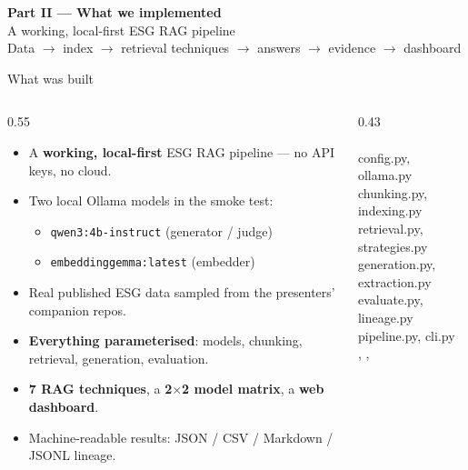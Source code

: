 \documentclass[aspectratio=169]{beamer}
\begin{document}
\begin{frame}
  \begin{center}
    \vspace{1.2cm}
    {\Large\bfseries Part II --- What we implemented}\\[4mm]
    {\large A working, local-first ESG RAG pipeline}\\[8mm]
    \small Data $\to$ index $\to$ retrieval techniques $\to$ answers $\to$ evidence $\to$ dashboard
  \end{center}
\end{frame}

\begin{frame}{What was built}
  \begin{columns}[T]
    \begin{column}{0.55\textwidth}
      \begin{itemize}
        \item A \textbf{working, local-first} ESG RAG pipeline --- no API keys, no cloud.
        \item Two local Ollama models in the smoke test:
          \begin{itemize}
            \item \texttt{qwen3:4b-instruct} (generator / judge)
            \item \texttt{embeddinggemma:latest} (embedder)
          \end{itemize}
        \item Real published ESG data sampled from the presenters' companion repos.
        \item \textbf{Everything parameterised}: models, chunking, retrieval, generation, evaluation.
        \item \textbf{7 RAG techniques}, a \textbf{2$\times$2 model matrix}, a \textbf{web dashboard}.
        \item Machine-readable results: JSON / CSV / Markdown / JSONL lineage.
      \end{itemize}
    \end{column}
    \begin{column}{0.43\textwidth}
      \footnotesize
      \\
      \quad {}\\
      \quad\quad config.py, ollama.py\\
      \quad\quad chunking.py, indexing.py\\
      \quad\quad retrieval.py, strategies.py\\
      \quad\quad generation.py, extraction.py\\
      \quad\quad evaluate.py, lineage.py\\
      \quad\quad pipeline.py, cli.py\\
      \quad {}, , \\
      \quad {}
    \end{column}
  \end{columns}
\end{frame}
\end{document}
